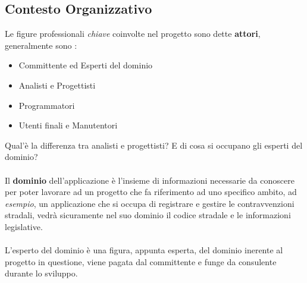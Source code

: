 \documentclass[12pt, letterpaper]{article}
\newcommand{\acc}{\\\hphantom{}\\}
\begin{document}
\subsection{Contesto Organizzativo}
Le figure professionali \textit{chiave} coinvolte nel progetto sono dette \textbf{attori}, generalmente
sono :\begin{itemize}
    \item Committente ed Esperti del dominio
    \item Analisti e Progettisti
    \item Programmatori
    \item Utenti finali e Manutentori
\end{itemize}
Qual'è la differenza tra analisti e progettisti? E di cosa si occupano gli esperti del dominio?\acc
Il \textbf{dominio} dell'applicazione è l'insieme di informazioni necessarie da conoscere per poter lavorare
ad un progetto che fa riferimento ad uno specifico ambito, ad \textit{esempio}, un applicazione che si occupa
di registrare e gestire le contravvenzioni stradali, vedrà sicuramente nel suo dominio il codice stradale
e le informazioni legislative. \acc L'esperto del dominio è una figura, appunta esperta, del dominio inerente
al progetto in questione, viene pagata dal committente e funge da consulente durante lo sviluppo.
\end{document}
